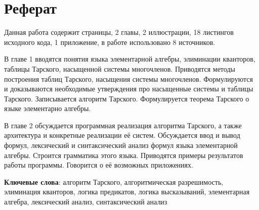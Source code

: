 \section*{Реферат}

Данная работа содержит \pageref{LastPage} страницы, 2 главы, 2 иллюстрации, 18 листингов исходного кода, 1 приложение, в работе использовано 8 источников.

В главе 1 вводятся понятия языка элементарной алгебры, элиминации кванторов, таблицы Тарского, насыщенной системы многочленов. Приводятся методы построения таблиц Тарского, насыщения системы многочленов. Формулируются и доказываются необходимые утверждения про насыщенные системы и таблицы Тарского. Записывается алгоритм Тарского. Формулируется теорема Тарского о языке элементарно алгебры.

В главе 2  обсуждается программная реализация алгоритма Тарского, а также архитектура и конкретные реализации её систем. Обсуждается ввод и вывод формул, лексический и синтаксический анализ формул языка элементарной алгебры. Строится грамматика этого языка. Приводятся примеры результатов работы программы. Говорится о её возможных приложениях.

\textbf{Ключевые слова}: алгоритм Тарского,
алгоритмическая разрешимость,
элиминация кванторов,
логика предикатов,
логика высказываний,
элементарная алгебра,
лексический анализ,
синтаксический анализ